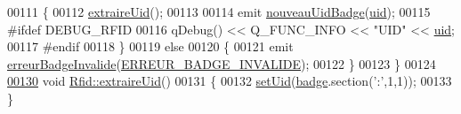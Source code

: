 \begin{DoxyCode}
00111     \{
00112         \hyperlink{class_rfid_a884e849f175045d78587e1e09a87cb00}{extraireUid}();
00113 
00114         emit \hyperlink{class_rfid_a76990ba3147098e80ac6fc67af6439d1}{nouveauUidBadge}(\hyperlink{class_rfid_a157b71d282a7e067c65b431dbae6c6c8}{uid});
00115 \textcolor{preprocessor}{        #ifdef DEBUG\_RFID}
00116             qDebug() << Q\_FUNC\_INFO << \textcolor{stringliteral}{"UID"} << \hyperlink{class_rfid_a157b71d282a7e067c65b431dbae6c6c8}{uid};
00117 \textcolor{preprocessor}{        #endif}
00118     \}
00119     \textcolor{keywordflow}{else}
00120     \{
00121         emit \hyperlink{class_rfid_a896a20a2fbe2ac7d842456a1161717cb}{erreurBadgeInvalide}(\hyperlink{_rfid_8h_aad43c23a448ffc828e0b6014cfaf980a}{ERREUR\_BADGE\_INVALIDE});
00122     \}
00123 \}
00124 
\hyperlink{class_rfid_a884e849f175045d78587e1e09a87cb00}{00130} \textcolor{keywordtype}{void} \hyperlink{class_rfid_a884e849f175045d78587e1e09a87cb00}{Rfid::extraireUid}()
00131 \{
00132     \hyperlink{class_rfid_ac79b994b32bf7a7cbad9d9988e721564}{setUid}(\hyperlink{class_rfid_ac634cd26ffbe1c6da3967dc4af53b734}{badge}.section(\textcolor{charliteral}{':'},1,1));
00133 \}
\end{DoxyCode}
